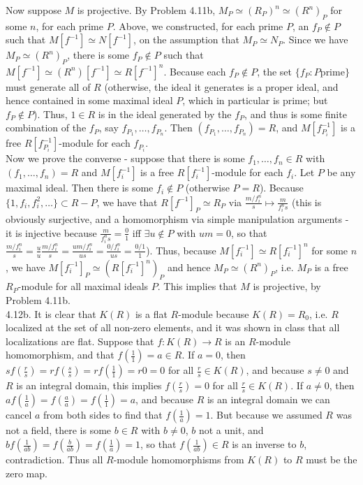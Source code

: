 \documentclass[11pt]{article}
\begin{document}
Now suppose $M$ is projective. By Problem 4.11b, $M_P\simeq (R_P)^n\simeq
(R^n)_P$ for some $n$, for each prime $P$. Above, we constructed, for
each prime $P$, an $f_P\notin P$ such that $M[f^{-1}]\simeq N[f^{-1}]$,
on the assumption that $M_P\simeq N_P$. Since we have $M_P\simeq (R^n)_P$,
there is some $f_P\notin P$ such that $M[f^{-1}]\simeq (R^n)[f^{-1}]\simeq
R[f^{-1}]^n$. Because each $f_P\notin P$, the set $\{f_P: P\text{
prime}\}$ must generate all of $R$ (otherwise, the ideal it generates is
a proper ideal, and hence contained in some maximal ideal $P$, which in
particular is prime; but $f_P\notin P$). Thus, $1\in R$ is in the ideal
generated by the $f_P$, and thus is some finite combination of the $f_P$,
say $f_{P_1},\ldots,f_{P_n}$. Then $(f_{P_1},\ldots,f_{P_n})=R$, and
$M[f_{P_i}^{-1}]$ is a free $R[f_{P_i}^{-1}]$-module for each $f_{P_i}$.\\

Now we prove the converse - suppose that there is some $f_1,\ldots,f_n\in R$
with $(f_1,\ldots,f_n)=R$ and $M[f_i^{-1}]$ is a free $R[f_i^{-1}]$-module for
each $f_i$. Let $P$ be any maximal ideal. Then there is some $f_i\notin
P$ (otherwise $P=R$). Because $\{1,f_i,f_i^2,\ldots\}\subset R-P$,
we have that $R[f^{-1}]_P\simeq R_P$ via $\frac{m/f_i^n}{s}\mapsto
\frac{m}{f_i^ns}$ (this is obviously surjective, and a homomorphism
via simple manipulation arguments - it is injective because
$\frac{m}{f_i^ns}=\frac{0}{1}$ iff $\exists u\notin P$ with $um=0$, so that
$\frac{m/f_i^n}{s}=\frac{u}{u}\frac{m/f_i^n}{s}=\frac{um/f_i^n}{us}=\frac{0/f_i^n}{us}=\frac{0/1}{1}$).
Thus, because $M[f_i^{-1}]\simeq R[f_i^{-1}]^n$ for some $n$, we have
$M[f_i^{-1}]_P\simeq (R[f_i^{-1}]^n)_P$ and hence $M_P\simeq (R^n)_P$,
i.e. $M_P$ is a free $R_P$-module for all maximal ideals $P$. This implies
that $M$ is projective, by Problem 4.11b.   \\

\num{4.12b.} It is clear that $K(R)$ is a flat $R$-module because $K(R)=R_0$,
i.e. $R$ localized at the set of all non-zero elements, and it was shown
in class that all localizations are flat. Suppose that $f:K(R)\rightarrow
R$ is an $R$-module homomorphism, and that $f(\frac{1}{1})=a\in R$. If
$a=0$, then $sf(\frac{r}{s})=rf(\frac{s}{s})=rf(\frac{1}{1})=r0=0$ for
all $\frac{r}{s}\in K(R)$, and because $s\neq 0$ and $R$ is an integral
domain, this implies $f(\frac{r}{s})=0$ for all $\frac{r}{s}\in K(R)$. If
$a\neq 0$, then $af(\frac{1}{a})=f(\frac{a}{a})=f(\frac{1}{1})=a$,
and because $R$ is an integral domain we can cancel $a$ from both
sides to find that $f(\frac{1}{a})=1$. But because we assumed $R$
was not a field, there is some $b\in R$ with $b\neq0$, $b$ not a
unit, and $bf(\frac{1}{ab})=f(\frac{b}{ab})=f(\frac{1}{a})=1$, so that
$f(\frac{1}{ab})\in R$ is an inverse to $b$, contradiction. Thus all $R$-module
homomorphisms from $K(R)$ to $R$ must be the zero map.\\
\end{document}
